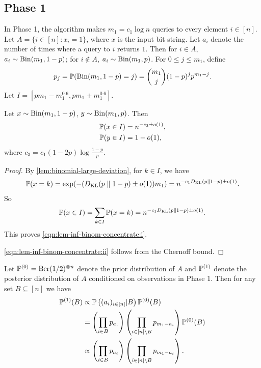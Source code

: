 \subsection{Phase 1} \label{sec:inf:phase-1}
In Phase 1, the algorithm makes $m_1 = c_1 \log n$ queries to every element $i\in [n]$.
Let $A = \{i\in [n]: x_i=1\}$, where $x$ is the input bit string.
Let $a_i$ denote the number of times where a query to $i$ returns $1$. Then for $i\in A$, $a_i\sim \operatorname{\mathrm{Bin}}(m_1,1-p)$; for $i\not \in A$, $a_i \sim \operatorname{\mathrm{Bin}}(m_1,p)$. For $0\le j\le m_1$, define
\begin{align}
  p_j = \mathbb{P}(\operatorname{\mathrm{Bin}}(m_1,1-p)=j) = \binom{m_1}j (1-p)^j p^{m_1-j}.
\end{align}
Let $I = \left[ p m_1 - m_1^{0.6}, p m_1 + m_1^{0.6} \right]$.
\begin{lemma} \label{lem:inf:binom-concentrate}
  Let $x\sim \operatorname{\mathrm{Bin}}(m_1, 1-p)$, $y\sim \operatorname{\mathrm{Bin}}(m_1, p)$.
  Then
  \begin{align}
    \label{eqn:lem-inf-binom-concentrate:i} \mathbb{P}(x\in I) &= n^{-c_3\pm o(1)}, \\
    \label{eqn:lem-inf-binom-concentrate:ii} \mathbb{P}(y\in I) &= 1-o(1),
  \end{align}
  where $c_3 = c_1(1-2p)\log\frac{1-p}p$.
\end{lemma}
\begin{proof}
  By \cref{lem:binomial-large-deviation}, for $k\in I$, we have
  \begin{align*}
    \mathbb{P}(x=k) = \exp(-(D_{\operatorname{\mathrm{KL}}}(p \parallel 1-p)\pm o(1)) m_1) = n^{-c_1 D_{\operatorname{\mathrm{KL}}}(p \parallel 1-p) \pm o(1)}.
  \end{align*}
  So
  \begin{align*}
    \mathbb{P}(x\in I) = \sum_{k\in I} \mathbb{P}(x=k) = n^{-c_1 D_{\operatorname{\mathrm{KL}}}(p \parallel 1-p) \pm o(1)}.
  \end{align*}
  This proves \cref{eqn:lem-inf-binom-concentrate:i}.

  \cref{eqn:lem-inf-binom-concentrate:ii} follows from the Chernoff bound.
\end{proof}

Let $\mathbb{P}^{(0)} = \operatorname{\mathrm{Ber}}(1/2)^{\otimes n}$ denote the prior distribution of $A$ and $\mathbb{P}^{(1)}$ denote the posterior distribution of $A$ conditioned on observations in Phase 1. Then for any set $B\subseteq [n]$ we have
\begin{align*}
  \mathbb{P}^{(1)}(B) &\propto \mathbb{P}\left((a_i)_{i\in [n]} | B\right) \mathbb{P}^{(0)}(B) \\
  &= \left(\prod_{i\in B} p_{a_i}\right) \left(\prod_{i\in [n] \backslash B} p_{m_1-a_i}\right) \mathbb{P}^{(0)}(B) \\
  &\propto \left(\prod_{i\in B} p_{a_i}\right) \left(\prod_{i\in [n] \backslash B} p_{m_1-a_i}\right).
\end{align*}

